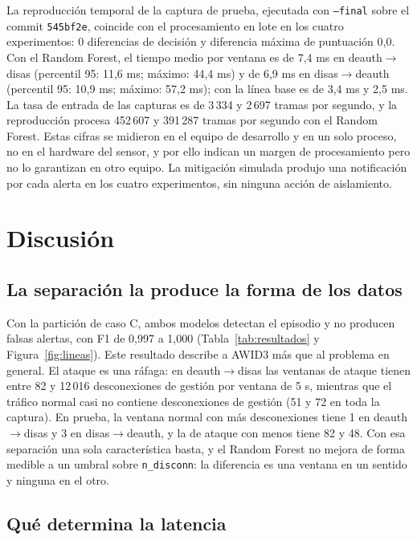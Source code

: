 \documentclass[journal]{IEEEtran}
\begin{document}
La reproducción temporal de la captura de prueba, ejecutada con \texttt{--final} sobre el commit \texttt{545bf2e}, coincide con el procesamiento en lote en los cuatro experimentos: 0 diferencias de decisión y diferencia máxima de puntuación 0,0. Con el Random Forest, el tiempo medio por ventana es de 7,4 ms en deauth$\rightarrow$disas (percentil 95: 11,6 ms; máximo: 44,4 ms) y de 6,9 ms en disas$\rightarrow$deauth (percentil 95: 10,9 ms; máximo: 57,2 ms); con la línea base es de 3,4 ms y 2,5 ms. La tasa de entrada de las capturas es de 3\,334 y 2\,697 tramas por segundo, y la reproducción procesa 452\,607 y 391\,287 tramas por segundo con el Random Forest. Estas cifras se midieron en el equipo de desarrollo y en un solo proceso, no en el hardware del sensor, y por ello indican un margen de procesamiento pero no lo garantizan en otro equipo. La mitigación simulada produjo una notificación por cada alerta en los cuatro experimentos, sin ninguna acción de aislamiento.

\section{Discusión}

\subsection{La separación la produce la forma de los datos}

Con la partición de caso C, ambos modelos detectan el episodio y no producen falsas alertas, con F1 de 0,997 a 1,000 (Tabla~\ref{tab:resultados} y Figura~\ref{fig:lineas}). Este resultado describe a AWID3 más que al problema en general. El ataque es una ráfaga: en deauth$\rightarrow$disas las ventanas de ataque tienen entre 82 y 12\,016 desconexiones de gestión por ventana de 5 s, mientras que el tráfico normal casi no contiene desconexiones de gestión (51 y 72 en toda la captura). En prueba, la ventana normal con más desconexiones tiene 1 en deauth$\rightarrow$disas y 3 en disas$\rightarrow$deauth, y la de ataque con menos tiene 82 y 48. Con esa separación una sola característica basta, y el Random Forest no mejora de forma medible a un umbral sobre \texttt{n\_disconn}: la diferencia es una ventana en un sentido y ninguna en el otro.

\subsection{Qué determina la latencia}
\end{document}
